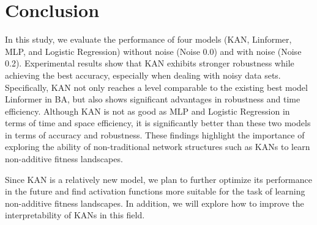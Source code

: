 \documentclass{article}
\begin{document}
 \section{Conclusion}
In this study, we evaluate the performance of four models (KAN, Linformer, MLP, and Logistic Regression) without noise (Noise 0.0) and with noise (Noise 0.2). Experimental results show that KAN exhibits stronger robustness while achieving the best accuracy, especially when dealing with noisy data sets. Specifically, KAN not only reaches a level comparable to the existing best model Linformer in BA, but also shows significant advantages in robustness and time efficiency. Although KAN is not as good as MLP and Logistic Regression in terms of time and space efficiency, it is significantly better than these two models in terms of accuracy and robustness. These findings highlight the importance of exploring the ability of non-traditional network structures such as KANs to learn non-additive fitness landscapes.

Since KAN is a relatively new model, we plan to further optimize its performance in the future and find activation functions more suitable for the task of learning non-additive fitness landscapes. In addition, we will explore how to improve the interpretability of KANs in this field.




\printbibliography 
\end{document}
